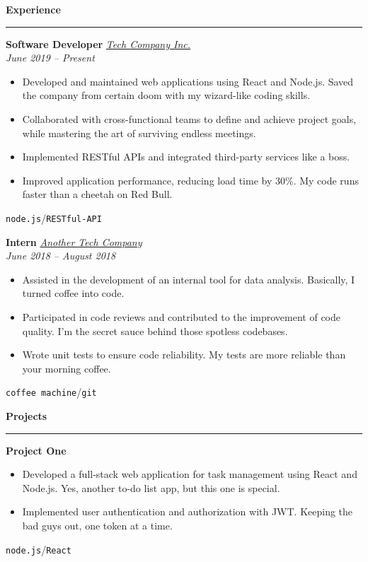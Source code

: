 \documentclass[a4paper,11pt]{article}
\newcommand{\sectiontitle}[1]{\vspace{1em}\textbf{\Large #1}\par\vspace{-1em}\noindent\rule{\linewidth}{0.3mm}\par\vspace{0.3em}}
\newcommand{\slashsep}{\hspace{3mm}/\hspace{3mm}}
\begin{document}
\begin{minipage}[t]{0.65\textwidth-0.5\columnsep}
	\sectiontitle{Experience}

    \textbf{\large Software Developer} \hfill \href{https://github.com/klepp0/resume}{\textit{Tech Company Inc.}}\\
	\textit{June 2019 -- Present}
	\vspace{-0.8em}
	\begin{itemize}
		\item Developed and maintained web applications using React and Node.js. Saved the company from certain doom with my wizard-like coding skills.
		\item Collaborated with cross-functional teams to define and achieve project goals, while mastering the art of surviving endless meetings.
		\item Implemented RESTful APIs and integrated third-party services like a boss.
		\item Improved application performance, reducing load time by 30\%. My code runs faster than a cheetah on Red Bull.
	\end{itemize}
	\vspace{-0.8em}
	\texttt{node.js}\slashsep\texttt{RESTful-API}
	\vspace{0.5em}

    \textbf{\large Intern} \hfill \href{https://github.com/klepp0/resume}{\textit{Another Tech Company}}\\
	\textit{June 2018 -- August 2018}
	\vspace{-0.8em}
	\begin{itemize}
		\item Assisted in the development of an internal tool for data analysis. Basically, I turned coffee into code.
		\item Participated in code reviews and contributed to the improvement of code quality. I'm the secret sauce behind those spotless codebases.
		\item Wrote unit tests to ensure code reliability. My tests are more reliable than your morning coffee.
	\end{itemize}
	\vspace{-0.8em}
	\texttt{coffee machine}\slashsep\texttt{git}

	\sectiontitle{Projects}

	\textbf{\large Project One}
	\vspace{-0.8em}
	\begin{itemize}
		\item Developed a full-stack web application for task management using React and Node.js. Yes, another to-do list app, but this one is special.
		\item Implemented user authentication and authorization with JWT. Keeping the bad guys out, one token at a time.
	\end{itemize}
	\vspace{-0.8em}
	\texttt{node.js}\slashsep\texttt{React}
	\vspace{0.5em}


\end{minipage}
\end{document}
